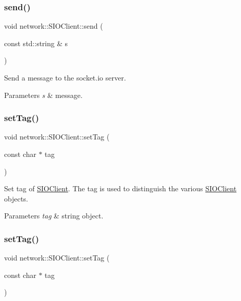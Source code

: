 \subsubsection{\texorpdfstring{send()}{send()}\hspace{0.1cm}{\footnotesize\ttfamily [2/2]}}
{\footnotesize\ttfamily void network\+::\+S\+I\+O\+Client\+::send (\begin{DoxyParamCaption}\item[{const std\+::string \&}]{s }\end{DoxyParamCaption})}

Send a message to the socket.\+io server.


\begin{DoxyParams}{Parameters}
{\em s} & message. \\
\hline
\end{DoxyParams}
\mbox{\label{classnetwork_1_1SIOClient_a61511bcf1cfb9cd450ac7babd650c441}} 
\subsubsection{\texorpdfstring{set\+Tag()}{setTag()}\hspace{0.1cm}{\footnotesize\ttfamily [1/2]}}
{\footnotesize\ttfamily void network\+::\+S\+I\+O\+Client\+::set\+Tag (\begin{DoxyParamCaption}\item[{const char $\ast$}]{tag }\end{DoxyParamCaption})}

Set tag of \hyperlink{classnetwork_1_1SIOClient}{S\+I\+O\+Client}. The tag is used to distinguish the various \hyperlink{classnetwork_1_1SIOClient}{S\+I\+O\+Client} objects. 
\begin{DoxyParams}{Parameters}
{\em tag} & string object. \\
\hline
\end{DoxyParams}
\mbox{\label{classnetwork_1_1SIOClient_a61511bcf1cfb9cd450ac7babd650c441}} 
\subsubsection{\texorpdfstring{set\+Tag()}{setTag()}\hspace{0.1cm}{\footnotesize\ttfamily [2/2]}}
{\footnotesize\ttfamily void network\+::\+S\+I\+O\+Client\+::set\+Tag (\begin{DoxyParamCaption}\item[{const char $\ast$}]{tag }\end{DoxyParamCaption})}

